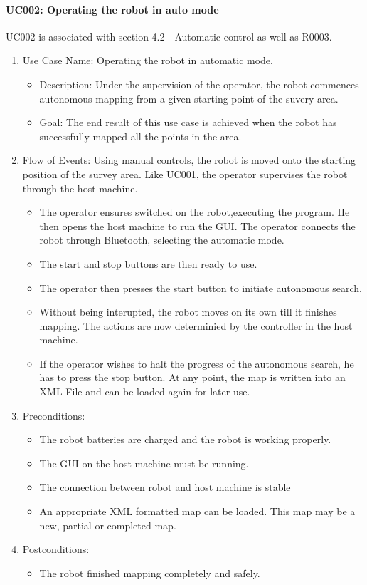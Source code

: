 \paragraph {UC002: Operating the robot in auto mode}
UC002 is associated with section 4.2 - Automatic control as well as R0003.
\begin{enumerate}
	\item Use Case Name: Operating the robot in automatic mode.
	\begin{itemize}
		\item Description: Under the supervision of the operator, the robot commences autonomous mapping from
		a given starting point of the suvery area.
		\item Goal: The end result of this use case is achieved when the robot has successfully mapped all the points in the area.
	\end{itemize}
	\item  Flow of Events: Using manual controls, the robot is moved onto the starting position of the
survey area. Like UC001, the operator supervises the robot through the host machine.
	\begin{itemize}
		\item The operator ensures switched on the robot,executing the program. He then
opens the host machine to run the GUI. The operator connects the robot through Bluetooth, selecting the automatic mode.
		\item The start and stop buttons are then ready to use.
		\item The operator then presses the start button to initiate autonomous search.
		\item Without being interupted, the robot moves on its own till it finishes mapping. The actions are now determinied by the controller in the host machine.
		\item If the operator wishes to halt the progress of the autonomous search, he has to press the stop
button. At any point, the map is written into an XML File and can be loaded again for later
use.
	\end{itemize}
	\item Preconditions:
	\begin{itemize}
		\item The robot batteries are charged and the robot is working properly.
		\item The GUI on the host machine must be running.
		\item The connection between robot and host machine is stable
		\item An appropriate XML formatted map can be loaded. This map may be a new, partial or
completed map.
	\end{itemize}
	\item Postconditions:
	\begin{itemize}
		\item The robot finished mapping completely and safely.
	\end{itemize}
\end{enumerate}
